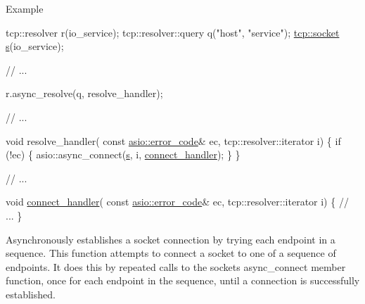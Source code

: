 \begin{DoxyParagraph}{Example}

\begin{DoxyCode}
 tcp::resolver r(io\_service);
tcp::resolver::query q(\textcolor{stringliteral}{"host"}, \textcolor{stringliteral}{"service"});
\hyperlink{namespacewebsocketpp_1_1transport_1_1asio_1_1socket_1_1error_a828ddaa5ed63a761e1b557465a35f05aa0c31b356014843e1d09514e794a539a7}{tcp::socket} \hyperlink{group__async__connect_ga31ab74b9ea6c77932dddd016cfc7920a}{s}(io\_service);

\textcolor{comment}{// ...}

r.async\_resolve(q, resolve\_handler);

\textcolor{comment}{// ...}

\textcolor{keywordtype}{void} resolve\_handler(
    \textcolor{keyword}{const} \hyperlink{classasio_1_1error__code}{asio::error\_code}& ec,
    tcp::resolver::iterator i)
\{
  \textcolor{keywordflow}{if} (!ec)
  \{
    asio::async\_connect(\hyperlink{group__async__connect_ga31ab74b9ea6c77932dddd016cfc7920a}{s}, i, \hyperlink{namespacewebsocketpp_1_1transport_ac392fca34e946b48414278c0c3addfa5}{connect\_handler});
  \}
\}

\textcolor{comment}{// ...}

\textcolor{keywordtype}{void} \hyperlink{namespacewebsocketpp_1_1transport_ac392fca34e946b48414278c0c3addfa5}{connect\_handler}(
    \textcolor{keyword}{const} \hyperlink{classasio_1_1error__code}{asio::error\_code}& ec,
    tcp::resolver::iterator i)
\{
  \textcolor{comment}{// ...}
\} 
\end{DoxyCode}

\end{DoxyParagraph}
Asynchronously establishes a socket connection by trying each endpoint in a sequence. This function attempts to connect a socket to one of a sequence of endpoints. It does this by repeated calls to the socket\textquotesingle{}s {\ttfamily async\+\_\+connect} member function, once for each endpoint in the sequence, until a connection is successfully established.



